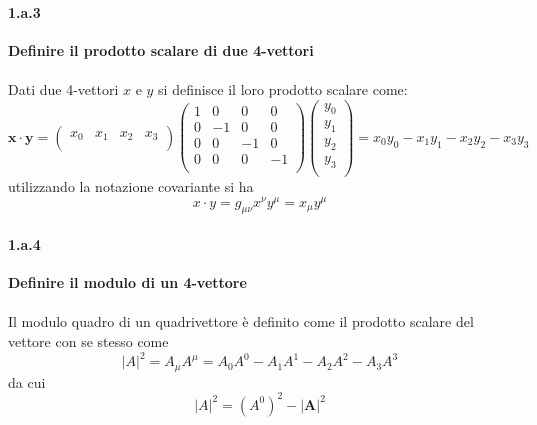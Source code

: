 \documentclass[twoside]{article}
\begin{document}
\paragraph{1.a.3} \textbf{Definire il prodotto scalare di due 4-vettori}\\
\\
Dati due 4-vettori $x$ e $y$ si definisce il loro prodotto scalare come:
\[
\mathbf{x}\cdot \mathbf{y}=\begin{pmatrix}
x_0 &x_1 &x_2&x_3\\
\end{pmatrix}\begin{pmatrix}
1&0&0&0\\
0&-1&0&0\\
0&0&-1&0\\
0&0&0&-1\\
\end{pmatrix}\begin{pmatrix}
y_0\\
y_1\\
y_2\\
y_3\\
\end{pmatrix}=x_0y_0-x_1y_1-x_2y_2-x_3y_3
\]
utilizzando la notazione covariante si ha
\begin{equation*}
    x\cdot y=g_{\mu\nu}x^{\nu}y^{\mu}=x_{\mu}y^{\mu}
\end{equation*}
\paragraph{1.a.4} \textbf{Definire il modulo di un 4-vettore}\\
\\
Il modulo quadro di un quadrivettore è definito come il prodotto scalare del vettore con se stesso come
\begin{equation*}
    |A|^2=A_{\mu}A^{\mu}=A_0A^0-A_1A^1-A_2A^2-A_3A^3
\end{equation*}
da cui
\begin{equation*}
    |A|^2=(A^0)^2-|\mathbf{A}|^2
\end{equation*}
\end{document}
